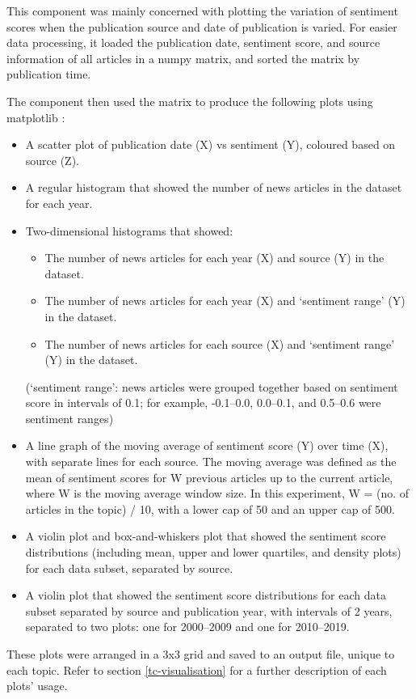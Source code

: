\documentclass{report}
\begin{document}
This component was mainly concerned with plotting the variation of sentiment scores when the publication source and date of publication is varied.
For easier data processing, it loaded the publication date, sentiment score, and source information of all articles in a numpy matrix, and sorted the matrix by publication time.

The component then used the matrix to produce the following plots using matplotlib \cite{Matplotlib}:
\begin{itemize}
	\item A scatter plot of publication date (X) vs sentiment (Y), coloured based on source (Z).
	\item A regular histogram that showed the number of news articles in the dataset for each year.
	\item Two-dimensional histograms that showed:
		\begin{itemize}
			\item The number of news articles for each year (X) and source (Y) in the dataset.
			\item The number of news articles for each year (X) and `sentiment range' (Y) in the dataset.
			\item The number of news articles for each source (X) and `sentiment range' (Y) in the dataset.
		\end{itemize}
		(`sentiment range': news articles were grouped together based on sentiment score in intervals of 0.1; for example, -0.1--0.0, 0.0--0.1, and 0.5--0.6 were sentiment ranges)
	\item A line graph of the moving average of sentiment score (Y) over time (X), with separate lines for each source.
		The moving average was defined as the mean of sentiment scores for W previous articles up to the current article, where W is the moving average window size.
		In this experiment, W = (no. of articles in the topic) / 10, with a lower cap of 50 and an upper cap of 500.
	\item A violin plot \cite{hintze1998violin} and box-and-whiskers plot \cite{tukey1977exploratory} that showed the sentiment score distributions (including mean, upper and lower quartiles, and density plots) for each data subset, separated by source.
	\item A violin plot that showed the sentiment score distributions for each data subset separated by source and publication year, with intervals of 2 years, separated to two plots: one for 2000--2009 and one for 2010--2019.
\end{itemize}
These plots were arranged in a 3x3 grid and saved to an output file, unique to each topic. 
Refer to section \ref{tc-visualisation} for a further description of each plots' usage.
\end{document}
